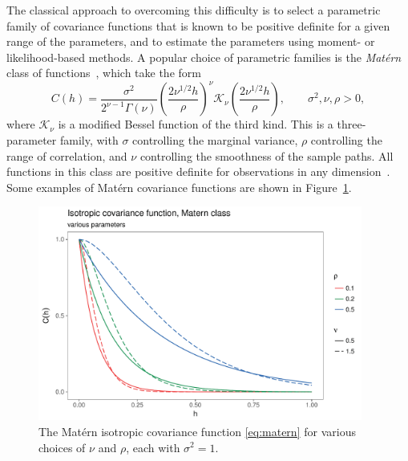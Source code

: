 \documentclass[12pt]{article}
\begin{document}
The classical approach to overcoming this difficulty is to select a parametric family of covariance functions that is known to be positive definite for a given range of the parameters, and to estimate the parameters using moment- or likelihood-based methods\cite{gelfand2010handbook}. A popular choice of parametric families is the \emph{Mat\'{e}rn} class of functions~\cite{handcock1994approach}, which take the form
\begin{equation} \label{eq:matern}
C(h) = \frac{\sigma^2}{2^{\nu - 1}\Gamma(\nu)} \left( \frac{2\nu^{1/2}h}{\rho} \right)^{\nu} \mathcal{K}_{\nu} \left( \frac{2\nu^{1/2}h}{\rho} \right), \qquad \sigma^2, \nu, \rho > 0,
\end{equation}
where $\mathcal{K}_\nu$ is a modified Bessel function of the third kind. This is a three-parameter family, with $\sigma$ controlling the marginal variance, $\rho$ controlling the range of correlation, and $\nu$ controlling the smoothness of the sample paths. All functions in this class are positive definite for observations in any dimension~\cite{Stein1999}. Some examples of Mat\'ern covariance functions are shown in Figure~\ref{fig:matern_examples}.


\begin{figure}[!htb]
  \centering
  \includegraphics[width=0.95\textwidth]{matern_examples.pdf}
  \caption{\small The Mat\'ern isotropic covariance function \eqref{eq:matern} for various choices of $\nu$ and $\rho$, each with $\sigma^2 = 1$.}
  \label{fig:matern_examples}
\end{figure}
\end{document}
